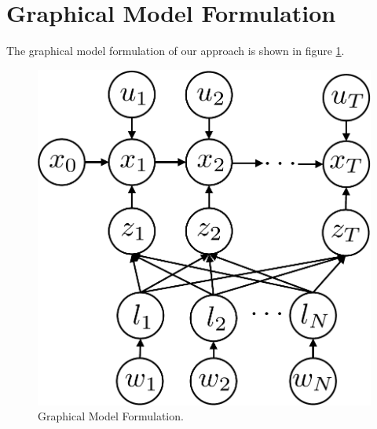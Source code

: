 \section{Graphical Model Formulation}
The graphical model formulation of our approach is shown in figure \ref{fig:model}. 
\begin{figure}[h]
\begin{center}
 \includegraphics[width=0.5\linewidth]{fig/model} 
\end{center}
\caption{Graphical Model Formulation.}
\label{fig:model}
\end{figure}